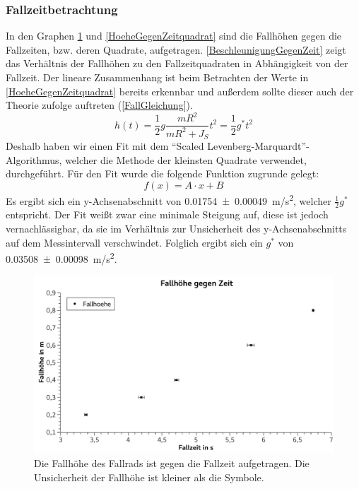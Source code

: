\documentclass[
	a4paper,
	12pt,
	pagesize,
	ngerman
]{scrartcl}
\begin{document}
	\subsubsection*{Fallzeitbetrachtung}%
	In den Graphen \cref{HoeheGegenZeit} und \cref{HoeheGegenZeitquadrat} sind die Fallhöhen gegen die Fallzeiten, bzw. deren Quadrate, aufgetragen.
	\cref{BeschleunigungGegenZeit} zeigt das Verhältnis der Fallhöhen zu den Fallzeitquadraten in Abhängigkeit von der Fallzeit.
	Der lineare Zusammenhang ist beim Betrachten der Werte in \cref{HoeheGegenZeitquadrat} bereits erkennbar und außerdem sollte dieser auch der Theorie zufolge auftreten (\cref{FallGleichung}).
	\begin{equation}
		h(t) = \frac{1}{2} g \frac{mR^2}{mR^2+J_S} t^2 = \frac{1}{2} g^* t^2
		\label{FallGleichung}
	\end{equation}
	Deshalb haben wir einen Fit mit dem \enquote{Scaled Levenberg-Marquardt}-Algorithmus, welcher die Methode der kleinsten Quadrate verwendet, durchgeführt.
	Für den Fit wurde die folgende Funktion zugrunde gelegt:
	\begin{equation}
		f(x)=A\cdot x+B
	\end{equation}
	Es ergibt sich ein y-Achsenabschnitt von \SI{0,01754\pm 0,00049}{m/s^2}, welcher $\frac{1}{2}g^*$ entspricht. Der Fit weißt zwar eine minimale Steigung auf, diese ist jedoch vernachlässigbar, da sie im Verhältnis zur Unsicherheit des y-Achsenabschnitts auf dem Messintervall verschwindet. Folglich ergibt sich ein $g^*$ von \SI{0,03508 \pm 0,00098}{m/s^2}.
	\begin{figure}[tb]
		\includegraphics[width=1\textwidth]{HoeheGegenZeit}
		\centering
		\caption{Die Fallhöhe des Fallrads ist gegen die Fallzeit aufgetragen. Die Unsicherheit der Fallhöhe ist kleiner als die Symbole.}
		\label{HoeheGegenZeit}
		\centering
	\end{figure}
\end{document}
